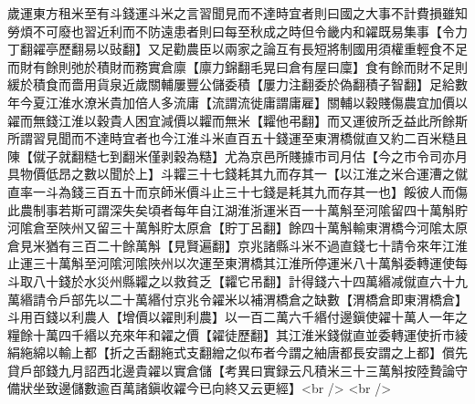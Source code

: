 歲運東方租米至有斗錢運斗米之言習聞見而不達時宜者則曰國之大事不計費損雖知勞煩不可廢也習近利而不防遠患者則曰每至秋成之時但令畿内和糴既易集事【令力丁翻糴亭歷翻易以䜴翻】又足勸農臣以兩家之論互有長短將制國用須權重輕食不足而財有餘則弛於積財而務實倉廪【廪力錦翻毛晃曰倉有屋曰廩】食有餘而財不足則緩於積食而嗇用貨泉近歲關輔屢豐公儲委積【屢力注翻委於偽翻積子智翻】足給數年今夏江淮水潦米貴加倍人多流庸【流謂流徙庸謂庸雇】關輔以穀賤傷農宜加價以糴而無錢江淮以穀貴人困宜減價以糶而無米【糶他弔翻】而又運彼所乏益此所餘斯所謂習見聞而不達時宜者也今江淮斗米直百五十錢運至東渭橋僦直又約二百米糙且陳【僦子就翻糙七到翻米僅剥穀為糙】尤為京邑所賤據市司月估【今之市令司亦月具物價低昂之數以聞於上】斗糶三十七錢耗其九而存其一【以江淮之米合運漕之僦直率一斗為錢三百五十而京師米價斗止三十七錢是耗其九而存其一也】餒彼人而傷此農制事若斯可謂深失矣頃者每年自江湖淮浙運米百一十萬斛至河隂留四十萬斛貯河隂倉至陜州又留三十萬斛貯太原倉【貯丁呂翻】餘四十萬斛輸東渭橋今河隂太原倉見米猶有三百二十餘萬斛【見賢遍翻】京兆諸縣斗米不過直錢七十請令來年江淮止運三十萬斛至河隂河隂陜州以次運至東渭橋其江淮所停運米八十萬斛委轉運使每斗取八十錢於水災州縣糶之以救貧乏【糶它吊翻】計得錢六十四萬緡减僦直六十九萬緡請令戶部先以二十萬緡付京兆令糴米以補渭橋倉之缺數【渭橋倉即東渭橋倉】斗用百錢以利農人【增價以糴則利農】以一百二萬六千緡付邊鎭使糴十萬人一年之糧餘十萬四千緡以充來年和糴之價【糴徒歷翻】其江淮米錢僦直並委轉運使折市綾絹絁綿以輸上都【折之舌翻絁式支翻繒之似布者今謂之紬唐都長安謂之上都】償先貸戶部錢九月詔西北邊貴糴以實倉儲【考異曰實録云凡積米三十三萬斛按陸贄論守備狀坐致邊儲數逾百萬諸鎭收糴今已向終又云更經】<br />
<br />
